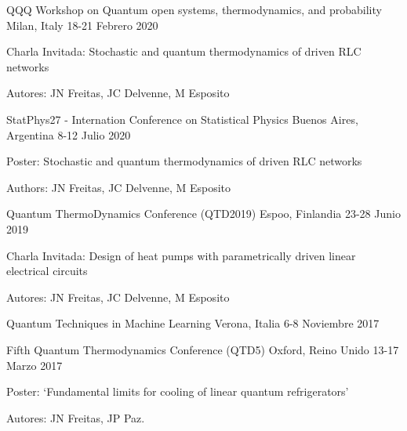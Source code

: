 

\begin{confentries}

  \confentry
    {QQQ Workshop on Quantum open systems, thermodynamics, and probability}
    {Milan, Italy} %
    {18-21 Febrero 2020} %
    {
    \begin{cvitems}
    \item Charla Invitada: Stochastic and quantum thermodynamics of driven RLC networks
    \item Autores: JN Freitas, JC Delvenne, M Esposito
    \end{cvitems}
    }

  \confentry
    {StatPhys27 - Internation Conference on Statistical Physics}
    {Buenos Aires, Argentina} %
    {8-12 Julio 2020} %
    {
    \begin{cvitems}
    \item Poster: Stochastic and quantum thermodynamics of driven RLC networks
    \item Authors: JN Freitas, JC Delvenne, M Esposito
    \end{cvitems}
    }

  \confentry
    {Quantum ThermoDynamics Conference (QTD2019)} %
    {Espoo, Finlandia} %
    {23-28 Junio 2019} %
    {
    \begin{cvitems}
    \item Charla Invitada: Design of heat pumps with parametrically driven linear
electrical circuits
    \item Autores: JN Freitas, JC Delvenne, M Esposito
    \end{cvitems}
    }

  \confentry
    {Quantum Techniques in Machine Learning} %
    {Verona, Italia} %
    {6-8 Noviembre 2017} %
    {
    }

  \confentry
    {Fifth Quantum Thermodynamics Conference (QTD5)} %
    {Oxford, Reino Unido} %
    {13-17 Marzo 2017} %
    {
    \begin{cvitems}
    \item Poster: ‘Fundamental limits for cooling of linear quantum refrigerators’
    \item Autores: JN Freitas, JP Paz.
    \end{cvitems}
    }


\end{confentries}
